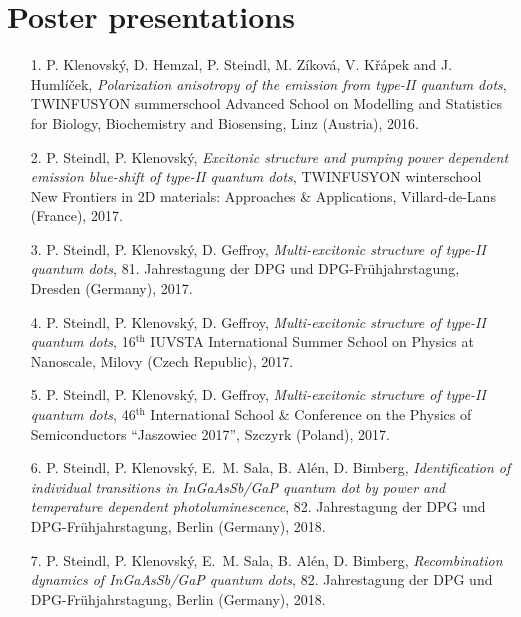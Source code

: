 \documentclass[
a4paper, %
11pt, %
onecolumn, %
openany, %
oldfontcommands,
]{memoir}
\begin{document}
\section*{Poster presentations}
\begin{itemize}
	\item[1.]  P. Klenovský, D. Hemzal, P. Steindl, M. Zíková, V. Křápek and J. Humlíček, \textit{Polarization anisotropy of the emission from type-II quantum dots}, TWINFUSYON summerschool Advanced School on Modelling and Statistics for Biology, Biochemistry and Biosensing, Linz (Austria), 2016. 
	
	
	\item[2.] P. Steindl, P. Klenovský, \textit{Excitonic structure and pumping power dependent emission blue-shift of type-II quantum dots}, TWINFUSYON winterschool New Frontiers in 2D materials: Approaches \& Applications, Villard-de-Lans (France), 2017.
	
	\item[3.] P. Steindl, P. Klenovský, D. Geffroy, \textit{Multi-excitonic structure of type-II quantum dots}, 81. Jahrestagung der DPG und DPG-Frühjahrstagung, Dresden (Germany), 2017. 
	
	\item[4.] P. Steindl, P. Klenovský, D. Geffroy, \textit{Multi-excitonic structure of type-II quantum dots}, 16$^{\mathrm{th}}$ IUVSTA International Summer School on Physics at Nanoscale, Milovy (Czech Republic), 2017.	
	
	\item[5.] P. Steindl, P. Klenovský, D. Geffroy, \textit{Multi-excitonic structure of type-II quantum dots}, 46$^{\mathrm{th}}$ International School \& Conference on the Physics of Semiconductors ``Jaszowiec 2017'', Szczyrk (Poland), 2017. 
	
	\item[6.] P. Steindl, P. Klenovský, E.~M. Sala, B. Alén, D. Bimberg, \textit{Identification of individual transitions in InGaAsSb/GaP quantum dot by power and temperature dependent photoluminescence}, 82. Jahrestagung der DPG und DPG-Frühjahrstagung, Berlin (Germany), 2018.
	
	
	\item[7.] P. Steindl, P. Klenovský, E.~M. Sala, B. Alén, D. Bimberg, \textit{Recombination dynamics of InGaAsSb/GaP quantum dots}, 82. Jahrestagung der DPG und DPG-Frühjahrstagung, Berlin (Germany), 2018.
	
\end{itemize}
\newpage 
\end{document}
